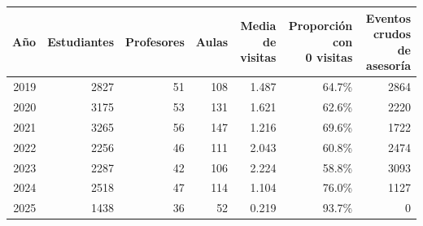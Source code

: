 \begin{tabular}{@{}rrrrrrr@{}}
\toprule
Año & Estudiantes & Profesores & Aulas & \shortstack[c]{Media de\\ visitas} & \shortstack[c]{Proporción con\\ 0 visitas} & \shortstack[c]{Eventos crudos\\ de asesoría} \\
\midrule
2019 & 2827 & 51 & 108 & 1.487 & 64.7\% & 2864 \\
2020 & 3175 & 53 & 131 & 1.621 & 62.6\% & 2220 \\
2021 & 3265 & 56 & 147 & 1.216 & 69.6\% & 1722 \\
2022 & 2256 & 46 & 111 & 2.043 & 60.8\% & 2474 \\
2023 & 2287 & 42 & 106 & 2.224 & 58.8\% & 3093 \\
2024 & 2518 & 47 & 114 & 1.104 & 76.0\% & 1127 \\
2025 & 1438 & 36 & 52 & 0.219 & 93.7\% & 0 \\
\bottomrule
\end{tabular}
